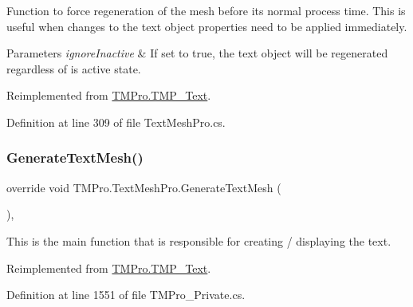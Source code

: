 Function to force regeneration of the mesh before its normal process time. This is useful when changes to the text object properties need to be applied immediately. 


\begin{DoxyParams}{Parameters}
{\em ignore\+Inactive} & If set to true, the text object will be regenerated regardless of is active state.\\
\hline
\end{DoxyParams}


Reimplemented from \mbox{\hyperlink{class_t_m_pro_1_1_t_m_p___text_a2cd34e05c191658295c67c373e608f5d}{T\+M\+Pro.\+T\+M\+P\+\_\+\+Text}}.



Definition at line 309 of file Text\+Mesh\+Pro.\+cs.

\mbox{\label{class_t_m_pro_1_1_text_mesh_pro_aa98e9ced224ca5ce5e71cbf213645128}} 
\subsubsection{\texorpdfstring{GenerateTextMesh()}{GenerateTextMesh()}}
{\footnotesize\ttfamily override void T\+M\+Pro.\+Text\+Mesh\+Pro.\+Generate\+Text\+Mesh (\begin{DoxyParamCaption}{ }\end{DoxyParamCaption})\hspace{0.3cm}{\ttfamily [protected]}, {\ttfamily [virtual]}}



This is the main function that is responsible for creating / displaying the text. 



Reimplemented from \mbox{\hyperlink{class_t_m_pro_1_1_t_m_p___text_a537ab0215d185079796cc94a455d2cdc}{T\+M\+Pro.\+T\+M\+P\+\_\+\+Text}}.



Definition at line 1551 of file T\+M\+Pro\+\_\+\+Private.\+cs.

\mbox{\label{class_t_m_pro_1_1_text_mesh_pro_ad718ed443f72e498e2fa64a1f794360d}} 

